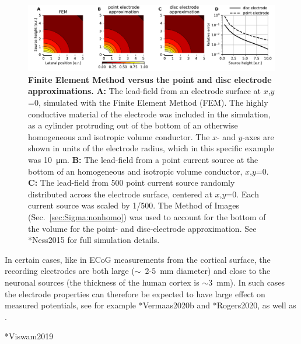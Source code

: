 \begin{figure}[!ht]
\begin{center}
\includegraphics[width=1\textwidth]{Figures/VC/fig_FEM_elec.pdf}
\end{center}
\caption[]{\textbf{Finite Element Method versus the point and disc electrode approximations.}
{\bf A:} The lead-field from an electrode surface at $x$,$y$=0, simulated with the Finite Element Method (FEM). The highly conductive material of the electrode was included in the simulation, as a cylinder protruding out of the bottom of an otherwise homogeneous and isotropic volume conductor. The $x$- and $y$-axes are shown in units of the electrode radius, which in this specific example was 10~\si{\micro\metre}.
{\bf B:} The lead-field from a point current source at the bottom of an homogeneous and isotropic volume conductor, $x$,$y$=0.
{\bf C:} The lead-field from 500 point current source randomly distributed across the electrode surface, centered at $x$,$y$=0. Each current source was scaled by 1/500.
The Method of Images (Sec.~\ref{sec:Sigma:nonhomo}) was used to account for the bottom of the volume for the point- and disc-electrode approximation.
See \citeasnoun**{Ness2015} for full simulation details.
}
\label{fig:VC:FEM_elec}
\end{figure}

In certain cases, like in ECoG  measurements from the cortical surface, the recording electrodes are both large ($\sim$~2-5~mm diameter) and close to the neuronal sources (the thickness of the human cortex is $\sim$3~mm). In such cases the electrode properties can therefore be expected to have large effect on measured potentials, see for example \citeasnoun**{Vermaas2020b} and \citeasnoun**{Rogers2020}, as well as .

 \citeasnoun**{Viswam2019}

